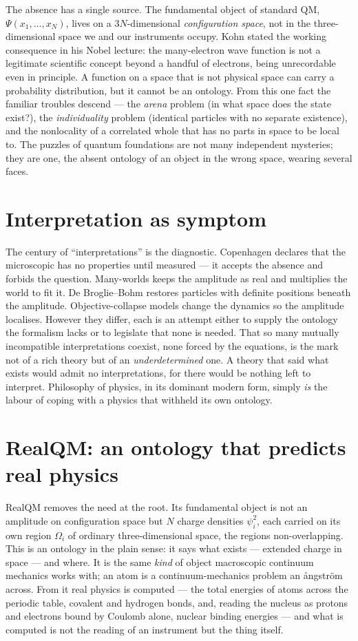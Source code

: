 The absence has a single source. The fundamental object of standard QM, $\Psi(x_1,\dots,x_N)$, lives on a
$3N$-dimensional \emph{configuration space}, not in the three-dimensional space we and our instruments occupy.
Kohn stated the working consequence in his Nobel lecture: the many-electron wave function is not a legitimate
scientific concept beyond a handful of electrons, being unrecordable even in principle. A function on a space
that is not physical space can carry a probability distribution, but it cannot be an ontology. From this one fact
the familiar troubles descend --- the \emph{arena} problem (in what space does the state exist?), the
\emph{individuality} problem (identical particles with no separate existence), and the nonlocality of a
correlated whole that has no parts in space to be local to. The puzzles of quantum foundations are not many
independent mysteries; they are one, the absent ontology of an object in the wrong space, wearing several faces.

\section{Interpretation as symptom}\label{sec:interpretation}

The century of ``interpretations'' is the diagnostic. Copenhagen declares that the microscopic has no properties
until measured --- it accepts the absence and forbids the question. Many-worlds keeps the amplitude as real and
multiplies the world to fit it. De Broglie--Bohm restores particles with definite positions beneath the
amplitude. Objective-collapse models change the dynamics so the amplitude localises. However they differ, each is
an attempt either to supply the ontology the formalism lacks or to legislate that none is needed. That so many
mutually incompatible interpretations coexist, none forced by the equations, is the mark not of a rich theory but
of an \emph{underdetermined} one. A theory that said what exists would admit no interpretations, for there would
be nothing left to interpret. Philosophy of physics, in its dominant modern form, simply \emph{is} the labour of
coping with a physics that withheld its own ontology.

\section{RealQM: an ontology that predicts real physics}\label{sec:realqm-ontology}

RealQM removes the need at the root. Its fundamental object is not an amplitude on configuration space but $N$
charge densities $\psi_i^2$, each carried on its own region $\Omega_i$ of ordinary three-dimensional space, the
regions non-overlapping. This is an ontology in the plain sense: it says what exists --- extended charge in
space --- and where. It is the same \emph{kind} of object macroscopic continuum mechanics works with; an atom is
a continuum-mechanics problem an \aa ngstr\"om across. From it real physics is computed --- the total energies of
atoms across the periodic table, covalent and hydrogen bonds, and, reading the nucleus as protons and electrons
bound by Coulomb alone, nuclear binding energies --- and what is computed is not the reading of an instrument but
the thing itself.

